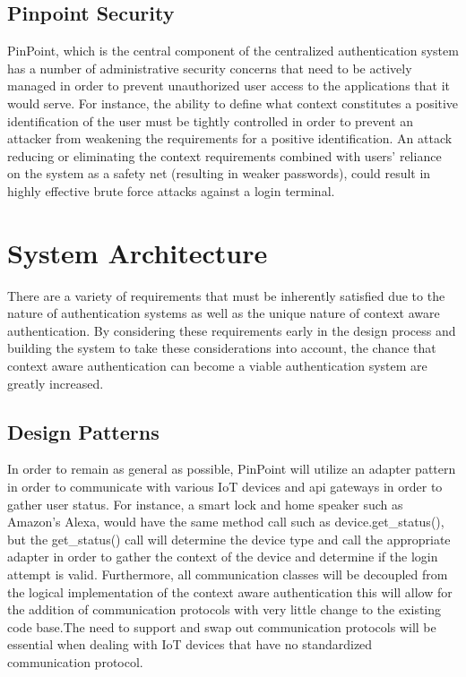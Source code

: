 \documentclass[11pt,journal]{IEEEtran}
\begin{document}
\subsection{Pinpoint Security}
PinPoint, which is the central component of the centralized authentication system has a number of administrative security concerns that need to be actively managed in order to prevent unauthorized user access to the applications that it would serve. For instance, the ability to define what context constitutes a positive identification of the user must be tightly controlled in order to prevent an attacker from weakening the 
requirements for a positive identification. An attack reducing or eliminating the context requirements combined with users’ reliance on the system as a safety net (resulting in weaker passwords), could result in highly effective brute force attacks against a login terminal.

\section{System Architecture}
There are a variety of requirements that must be inherently satisfied due to the nature of authentication systems as well as the unique nature of context aware authentication. By considering these requirements early in the design process and building the system to take these considerations into account, the chance that context aware authentication can become a viable authentication system are greatly increased.

\subsection{Design Patterns}
In order to remain as general as possible, PinPoint will utilize an adapter pattern in order to communicate with various IoT devices and api gateways in order to gather user status. For instance, a smart lock and home speaker such as Amazon’s Alexa, would have the same method call such as device.get\_status(), but the get\_status() call will determine the device type and call the appropriate adapter in order to gather the context of the device and determine if the login attempt is valid. Furthermore, all communication classes will be decoupled from the logical implementation of the context aware authentication this will allow for the addition of communication protocols with very little change to the existing code base.The need to support and swap out communication protocols will be essential when dealing with IoT devices that have no standardized communication protocol.
\end{document}
